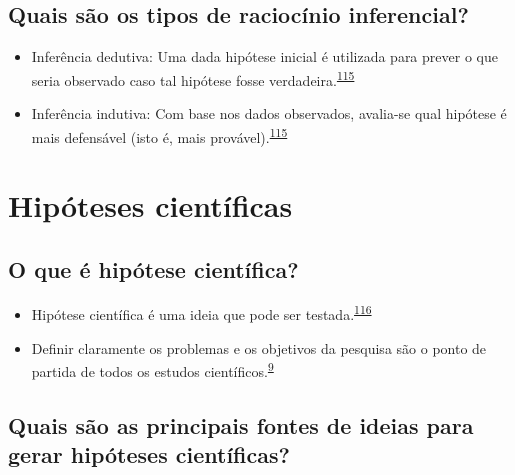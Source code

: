 \documentclass[
  a4paper,
]{book}
\begin{document}
\hypertarget{quais-suxe3o-os-tipos-de-raciocuxednio-inferencial}{%
\subsection{Quais são os tipos de raciocínio inferencial?}\label{quais-suxe3o-os-tipos-de-raciocuxednio-inferencial}}

\begin{itemize}
\item
  Inferência dedutiva: Uma dada hipótese inicial é utilizada para prever o que seria observado caso tal hipótese fosse verdadeira.\textsuperscript{\protect\hyperlink{ref-goodman1999}{115}}
\item
  Inferência indutiva: Com base nos dados observados, avalia-se qual hipótese é mais defensável (isto é, mais provável).\textsuperscript{\protect\hyperlink{ref-goodman1999}{115}}
\end{itemize}

\hypertarget{ideias-hipoteses}{%
\section{Hipóteses científicas}\label{ideias-hipoteses}}

\hypertarget{o-que-uxe9-hipuxf3tese-cientuxedfica}{%
\subsection{O que é hipótese científica?}\label{o-que-uxe9-hipuxf3tese-cientuxedfica}}

\begin{itemize}
\item
  Hipótese científica é uma ideia que pode ser testada.\textsuperscript{\protect\hyperlink{ref-Curran-Everett2009}{116}}
\item
  Definir claramente os problemas e os objetivos da pesquisa são o ponto de partida de todos os estudos científicos.\textsuperscript{\protect\hyperlink{ref-van2022a}{9}}
\end{itemize}

\hypertarget{quais-suxe3o-as-principais-fontes-de-ideias-para-gerar-hipuxf3teses-cientuxedficas}{%
\subsection{Quais são as principais fontes de ideias para gerar hipóteses científicas?}\label{quais-suxe3o-as-principais-fontes-de-ideias-para-gerar-hipuxf3teses-cientuxedficas}}
\end{document}

